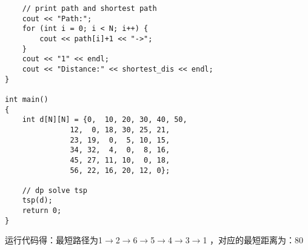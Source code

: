\documentclass{article}
\begin{document}
\begin{enumerate}
\begin{lstlisting}
	// print path and shortest path
	cout << "Path:";
	for (int i = 0; i < N; i++) {
		cout << path[i]+1 << "->";
	}
	cout << "1" << endl;
	cout << "Distance:" << shortest_dis << endl;
}

int main()
{
	int d[N][N] = {0,  10, 20, 30, 40, 50,
		       12,  0, 18, 30, 25, 21,
		       23, 19,  0,  5, 10, 15,
		       34, 32,  4,  0,  8, 16,
		       45, 27, 11, 10,  0, 18,
		       56, 22, 16, 20, 12, 0};
	
	// dp solve tsp
	tsp(d);
	return 0;
}

\end{lstlisting}

运行代码得：最短路径为1$\rightarrow$2$\rightarrow$6$\rightarrow$5$\rightarrow$4$\rightarrow$3$\rightarrow$1
	，对应的最短距离为：80
	\end{enumerate}
\end{document}
